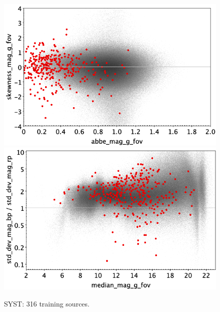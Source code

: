 \documentclass[longauth]{aa}
\begin{document}
\begin{appendix}
\begin{figure}
\vspace{4mm}
 \includegraphics[width=0.45\hsize]{figures/appendix/SYST_trn_ask.png}  %
\hspace{2mm}
 \includegraphics[width=0.45\hsize]{figures/appendix/SYST_trn_msdr.png}  \\ %
\vspace{4mm}
 \caption{SYST: 316 training sources.}  
 \label{fig:app:SYST_trn}
\end{figure}


\end{appendix}
\end{document}
